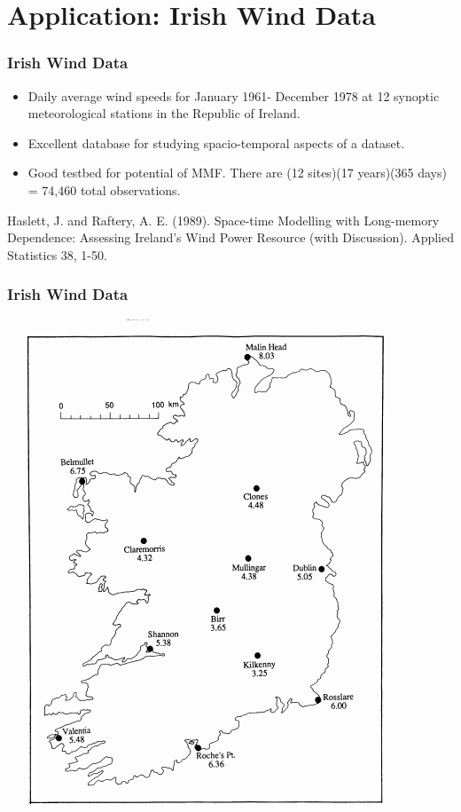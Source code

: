 \documentclass{beamer}
\begin{document}
\section{Application: Irish Wind Data}
\begin{frame}
\frametitle{Irish Wind Data}
\begin{itemize}
\item Daily average wind speeds for January 1961- December 1978 at 12 synoptic meteorological stations in the Republic of Ireland.
\item Excellent database for studying spacio-temporal aspects of a dataset. 
\item Good testbed for potential of MMF. There are (12 sites)(17 years)(365 days) = 74,460 total observations.
\end{itemize}
Haslett, J. and Raftery, A. E. (1989). Space-time Modelling with Long-memory Dependence: Assessing Ireland's Wind Power Resource (with Discussion). Applied Statistics 38, 1-50. 
\end{frame}
\begin{frame}
\frametitle{Irish Wind Data}
\begin{center}
\includegraphics[scale=0.4]{fig1.png}
\end{center}
\end{frame}
\end{document}
